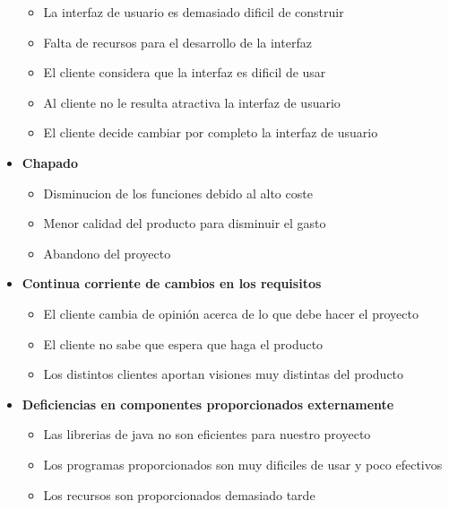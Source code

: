 \documentclass[spanish,a4paper,12pt]{report}	%
\begin{document}
\begin{itemize}
	\begin{itemize}
		\item {La interfaz de usuario es demasiado dificil de construir}
		\item {Falta de recursos para el desarrollo de la interfaz}
		\item {El cliente considera que la interfaz es dificil de usar}
		\item {Al cliente no le resulta atractiva la interfaz de usuario}
		\item {El cliente decide cambiar por completo la interfaz de usuario}
	\end{itemize}
\item \textbf {Chapado}
	\begin{itemize}
		\item {Disminucion de los funciones debido al alto coste}
		\item {Menor calidad del producto para disminuir el gasto}
		\item {Abandono del proyecto}
	\end{itemize}
\item \textbf {Continua corriente de cambios en los requisitos}
	\begin{itemize}
		\item {El cliente cambia de opinión acerca de lo que debe hacer el proyecto}
		\item {El cliente no sabe que espera que haga el producto}
		\item {Los distintos clientes aportan visiones muy distintas del producto}

	\end{itemize}
\item \textbf {Deficiencias en componentes proporcionados externamente}
	\begin{itemize}
		\item {Las librerias de java no son eficientes para nuestro proyecto}
		\item {Los programas proporcionados son muy dificiles de usar y poco efectivos}
		\item {Los recursos son proporcionados demasiado tarde}


\end{itemize}
\end{itemize}
\end{document}
